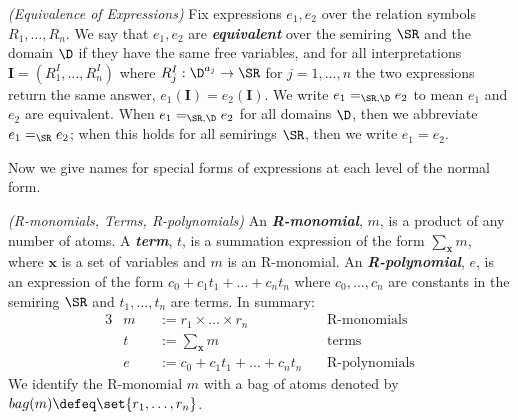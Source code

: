 \begin{defn}{\em (Equivalence of Expressions)} Fix  expressions $e_1, e_2$ over the relation symbols $R_1, \ldots, R_n$.  We say that $e_1, e_2$ are {\em \textbf{equivalent}} over the semiring $\SR$ and the domain $\D$ if they have the same free variables, and for all interpretations $\pmb{I} = (R_1^I, \ldots, R_n^I)$ where $R_j^I : \D^{a_j} \rightarrow \SR$ for $j=1, \ldots, n$ the two expressions return the same answer, $e_1(\pmb{I}) = e_2(\pmb{I})$.  We write $e_1 =_{\SR, \D} e_2$ to mean $e_1$ and $e_2$ are equivalent.  When $e_1 =_{\SR, \D} e_2$ for all domains $\D$, then we abbreviate $e_1 =_\SR e_2$; when this holds for all semirings $\SR$, then we write $e_1 = e_2$.
\end{defn}{}

Now we give names for special forms of expressions at each level of the normal form.
\begin{defn}{{\em (R-monomials, Terms, R-polynomials)}}\label{forms} 
 An \emph{\textbf{R-monomial}}, $m$, is a product of any number of atoms. A \emph{\textbf{term}}, $t$, is a summation expression of the form $\sum_{\pmb{x}} m$, where $\pmb{x}$ is a set of variables and $m$ is an R-monomial.  An \emph{\textbf{R-polynomial}}, $e$, is an expression of the form $c_0 + c_1 t_1 + \dots + c_n t_n$ where $c_0,\ldots,c_n$ are constants in the semiring $\SR$ and $t_1, \ldots, t_n$ are  terms. 
 In summary:
\begin{alignat}{3}
      &m & & := r_1 \times \dots \times r_n && \mbox{R-monomials} \label{eq:r:monomial} \\
      &t & & := \textstyle \sum_{\pmb{x}} m  &&  \mbox{terms} \label{eq:term} \\
      &e & & := c_0 + c_1 t_1 + \dots + c_n t_n \, && \mbox{R-polynomials} \label{eq:r:polynomial}
\end{alignat}{}
We identify the R-monomial $m$ with a bag of atoms denoted by $bag(m) \defeq \set{r_1, \ldots, r_n}$.
\end{defn}{}

